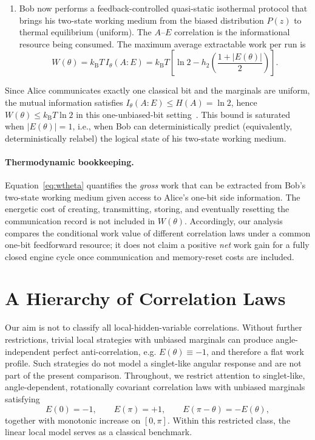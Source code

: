 \documentclass[pra,twocolumn,showpacs,preprintnumbers,amsmath,amssymb,longbibliography,
               superscriptaddress]{revtex4-2}
\begin{document}
\begin{enumerate}
\item {Bob now performs a feedback-controlled quasi-static isothermal
protocol that brings his two-state working medium from the biased
distribution $P(z)$ to thermal equilibrium (uniform).
The $A$--$E$ correlation is the informational resource being consumed.
The maximum average extractable work per run is~\cite{SagawaUeda2008,parrondo2015}
\begin{equation}
W(\theta) = k_{\mathrm{B}}T\,I_\theta(A{:}E)
= k_{\mathrm{B}}T\!\left[\ln 2
- h_2\!\left(\frac{1+|E(\theta)|}{2}\right)\right]\!.
\label{eq:wtheta}
\end{equation}}
\end{enumerate}

{Since Alice communicates exactly one classical bit and the marginals are
uniform, the mutual information satisfies
$I_\theta(A{:}E) \le H(A) = \ln 2$, hence
$W(\theta)\le k_{\mathrm{B}}T\ln 2$ in this one-unbiased-bit
setting~\cite{landauer:61,bennett-82}.
This bound is saturated when $|E(\theta)|=1$, i.e., when Bob can
deterministically predict (equivalently, deterministically relabel) the
logical state of his two-state working medium.}

{\paragraph{Thermodynamic bookkeeping.}
Equation~\eqref{eq:wtheta} quantifies the \emph{gross} work that can be
extracted from Bob's two-state working medium given access to Alice's
one-bit side information.
The energetic cost of creating, transmitting, storing, and eventually
resetting the communication record is not included in $W(\theta)$.
Accordingly, our analysis compares the conditional work value of
different correlation laws under a common one-bit feedforward resource;
it does not claim a positive \emph{net} work gain for a fully closed
engine cycle once communication and memory-reset costs are included.}

\section{A Hierarchy of Correlation Laws}
\label{sec:hierarchy}

{Our aim is not to classify all local-hidden-variable correlations.
Without further restrictions, trivial local strategies with unbiased
marginals can produce angle-independent perfect anti-correlation, e.g.
$E(\theta)\equiv -1$, and therefore a flat work profile.
Such strategies do not model a singlet-like angular response and are not
part of the present comparison.
Throughout, we restrict attention to singlet-like,
angle-dependent, rotationally covariant correlation laws with unbiased
marginals satisfying
\begin{equation}
E(0)=-1,\qquad E(\pi)=+1,\qquad E(\pi-\theta)=-E(\theta),
\label{eq:singlet_symmetry}
\end{equation}
together with monotonic increase on $[0,\pi]$.
Within this restricted class, the linear local model serves as a
classical benchmark.}
\end{document}
